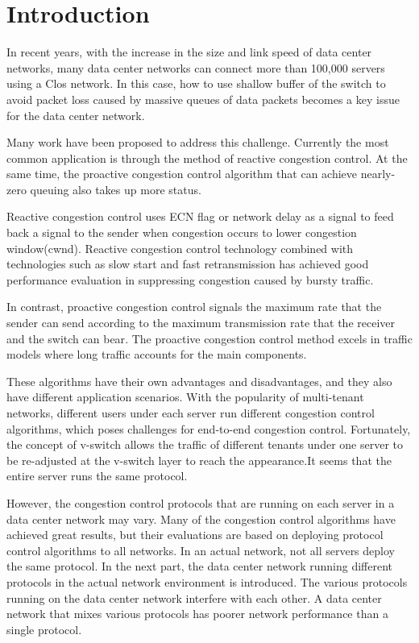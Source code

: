 \documentclass[conference]{IEEEtran}
\begin{document}
\section{Introduction}

In recent years, with the increase in the size and link speed of data center networks, many data center networks can connect more than 100,000 servers using a Clos network\cite{Arjun2016Jupiter}. In this case, how to use shallow buffer of the switch to avoid packet loss caused by massive queues of data packets becomes a key issue for the data center network\cite{Al2008A}\cite{GREENBERG2009VL2}.

\indent Many work have been proposed to address this challenge. Currently the most common application is through the method of reactive congestion control. At the same time, the proactive congestion control algorithm that can achieve nearly-zero queuing also takes up more status.

\indent Reactive congestion control uses ECN flag\cite{Alizadeh2010Data}\cite{Alizadeh2012Less}\cite{wu2010ictcp} \cite{zhu2015congestion}or network delay\cite{lee2015accurate}\cite{mittal2015timely}\cite{perry2015fastpass} as a signal to feed back a signal to the sender when congestion occurs to lower congestion window(cwnd). Reactive congestion control technology combined with technologies such as slow start and fast retransmission\cite{stevens1997tcp} has achieved good performance evaluation in suppressing congestion caused by bursty traffic\cite{benson2010network}\cite{Alizadeh2010Data}.

\indent In contrast, proactive congestion control signals the maximum rate that the sender can send according to the maximum transmission rate that the receiver and the switch can bear\cite{huang2018congestion}. The proactive congestion control method excels in traffic models where long traffic accounts for the main components.

\indent These algorithms have their own advantages and disadvantages, and they also have different application scenarios. With the popularity of multi-tenant networks, different users under each server run different congestion control algorithms, which poses challenges for end-to-end congestion control. Fortunately, the concept of v-switch allows the traffic of different tenants under one server to be re-adjusted at the v-switch layer to reach the appearance.It seems that the entire server runs the same protocol\cite{He2016AC}.

\indent However, the congestion control protocols that are running on each server in a data center network may vary. Many of the congestion control algorithms have achieved great results, but their evaluations are based on deploying protocol control algorithms to all networks. In an actual network, not all servers deploy the same protocol. In the next part, the data center network running different protocols in the actual network environment is introduced. The various protocols running on the data center network interfere with each other. A data center network that mixes various protocols has poorer network performance than a single protocol.
\end{document}
